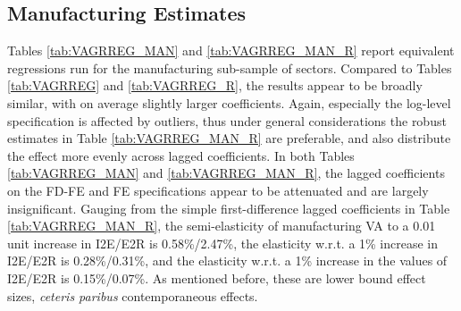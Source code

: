 \documentclass[a4paper]{article}
\begin{document}
\subsection{Manufacturing Estimates}

Tables \ref{tab:VAGRREG_MAN} and \ref{tab:VAGRREG_MAN_R} report equivalent regressions run for the manufacturing sub-sample of sectors. Compared to Tables \ref{tab:VAGRREG} and \ref{tab:VAGRREG_R}, the results appear to be broadly similar, with on average slightly larger coefficients. Again, especially the log-level specification is affected by outliers, thus under general considerations the robust estimates in Table \ref{tab:VAGRREG_MAN_R} are preferable, and also distribute the effect more evenly across lagged coefficients. In both Tables \ref{tab:VAGRREG_MAN} and \ref{tab:VAGRREG_MAN_R}, the lagged coefficients on the FD-FE and FE specifications appear to be attenuated and are largely insignificant. Gauging from the simple first-difference lagged coefficients in Table \ref{tab:VAGRREG_MAN_R}, the semi-elasticity of manufacturing VA to a 0.01 unit increase in I2E/E2R is 0.58\%/2.47\%, the elasticity w.r.t. a 1\% increase in I2E/E2R is 0.28\%/0.31\%, and the elasticity w.r.t. a 1\% increase in the values of I2E/E2R is 0.15\%/0.07\%. As mentioned before, these are lower bound effect sizes, \textit{ceteris paribus} contemporaneous effects. %
\end{document}
